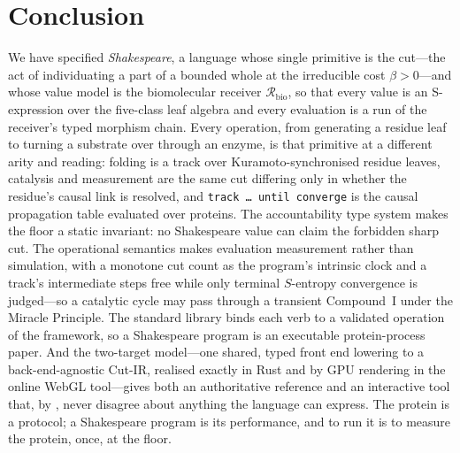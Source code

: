 \documentclass[11pt,a4paper]{article}
\theoremstyle{thmstyle}
\theoremstyle{definition}
\theoremstyle{remark}
\newcommand{\flo}{\beta}
\newcommand{\Recv}{\mathcal{R}_{\mathrm{bio}}}
\newcommand{\shk}[1]{\texttt{#1}}
\begin{document}
\section{Conclusion}
\label{sec:conclusion}

We have specified \emph{Shakespeare}, a language whose single primitive is
the cut---the act of individuating a part of a bounded whole at the
irreducible cost $\flo>0$---and whose value model is the biomolecular
receiver $\Recv$, so that every value is an S-expression over the five-class
leaf algebra and every evaluation is a run of the receiver's typed morphism
chain. Every operation, from generating a residue leaf to turning a
substrate over through an enzyme, is that primitive at a different arity and
reading: folding is a track over Kuramoto-synchronised residue leaves,
catalysis and measurement are the same cut differing only in whether the
residue's causal link is resolved, and \shk{track\,\ldots\,until\,converge}
is the causal propagation table evaluated over proteins. The
accountability type system makes the floor a static invariant: no
Shakespeare value can claim the forbidden sharp cut. The operational
semantics makes evaluation measurement rather than simulation, with a
monotone cut count as the program's intrinsic clock and a track's
intermediate steps free while only terminal $S$-entropy convergence is
judged---so a catalytic cycle may pass through a transient Compound~I under
the Miracle Principle. The standard library binds each verb to a validated
operation of the framework, so a Shakespeare program is an executable
protein-process paper. And the two-target model---one shared, typed front
end lowering to a back-end-agnostic Cut-IR, realised exactly in Rust and by
GPU rendering in the online WebGL tool---gives both an authoritative
reference and an interactive tool that, by , never
disagree about anything the language can express. The protein is a
protocol; a Shakespeare program is its performance, and to run it is to
measure the protein, once, at the floor.



\end{document}
